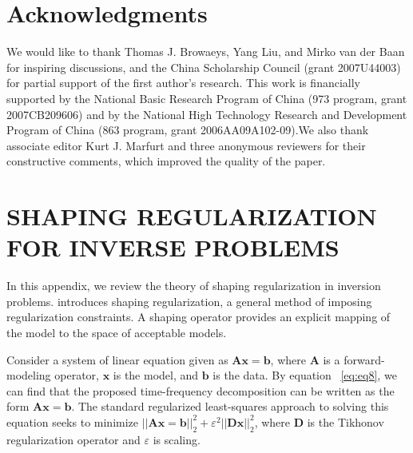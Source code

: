 \section{Acknowledgments}

We would like to thank Thomas J. Browaeys, Yang Liu, and
Mirko van der Baan for inspiring discussions, and the China
Scholarship Council (grant 2007U44003) for partial support of
the first author’s research. This work is financially supported by
the National Basic Research Program of China (973 program, grant
2007CB209606) and by the National High Technology Research
and Development Program of China (863 program, grant
2006AA09A102-09).We also thank associate editor Kurt J. Marfurt
and three anonymous reviewers for their constructive comments,
which improved the quality of the paper.

\appendix
\section{SHAPING REGULARIZATION FOR INVERSE PROBLEMS}

In this appendix, we review the theory of shaping regularization
in inversion problems. \cite{Fomel2007b} introduces shaping regularization,
a general method of imposing regularization constraints. A
shaping operator provides an explicit mapping of the model to the
space of acceptable models.

Consider a system of linear equation given as $\mathbf{Ax} = \mathbf{b}$, where $\mathbf{A}$ is
a forward-modeling operator, $\mathbf{x}$ is the model, and $\mathbf{b}$ is the data. By
equation ~\ref{eq:eq8}, we can find that the proposed time-frequency decomposition
can be written as the form $\mathbf{Ax} = \mathbf{b}$. The standard regularized
least-squares approach to solving this equation seeks to
minimize $\left| \left| \mathbf{Ax} = \mathbf{b} \right| \right| _{2}^{2}+\varepsilon ^{2} \left| \left| \mathbf{Dx} \right| \right| _{2}^{2}$, where $\mathbf{D}$ is the Tikhonov regularization
operator \cite[]{Tikhonov1963} and $\varepsilon$ is scaling.

